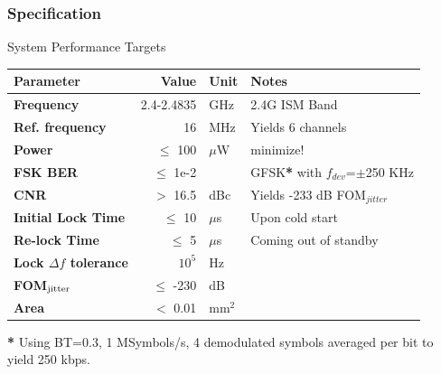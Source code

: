 \documentclass[t, screen, aspectratio=43]{beamer}
\begin{document}
\begin{frame}
	\frametitle{Specification\color{black}}
	\begin{block}{System Performance Targets}
		\tiny
		\begin{table}[h!]
			\centering
			\def\arraystretch{1.5}		
			\setlength\arrayrulewidth{0.75pt}
			\setlength{\tabcolsep}{1em} %
			\begin{tabular}{|l|r|l|l|}
				\hline 
				\rule[-1ex]{0pt}{2.5ex} \cellcolor{gray!40}\textbf{Parameter} & \cellcolor{gray!40}\textbf{Value} & \cellcolor{gray!40}\textbf{Unit }& \cellcolor{gray!40}\textbf{Notes}\\ 
				\hline 
				\rule[-1ex]{0pt}{2.5ex} \textbf{Frequency}  & 2.4-2.4835 & GHz & 2.4G ISM Band\\ 
				\hline 
				\rule[-1ex]{0pt}{2.5ex} \textbf{Ref. frequency} & 16 & MHz & Yields 6 channels \\ 
				\hline 
				\rule[-1ex]{0pt}{2.5ex} \textbf{Power} & $\leq$ 100  &$\mu$W & minimize!\\ 
				\hline 
				\rule[-1ex]{0pt}{2.5ex} \textbf{FSK BER} & $\leq$ 1e-2  & & GFSK\textbf{*} with $f_{dev}$=$\pm$250 KHz\\ 
				\hline 
				\rule[-1ex]{0pt}{2.5ex} \textbf{CNR} & $>$ 16.5 & dBc&Yields -233 dB FOM$_{jitter}$ \\ 
				\hline 
				\rule[-1ex]{0pt}{2.5ex} \textbf{Initial Lock Time} & $\leq$ 10 & $\mu$s & Upon cold start \\ 
				\hline 
				\rule[-1ex]{0pt}{2.5ex} \textbf{Re-lock Time} & $\leq$ 5 & $\mu$s & Coming out of standby \\ 
				\hline 
				\rule[-1ex]{0pt}{2.5ex} \textbf{Lock $\Delta f$ tolerance} & $10^5$ & Hz& \\ 
				\hline 
				\rule[-1ex]{0pt}{2.5ex} \textbf{FOM}$_{\textnormal{jitter}}$ & $\leq$ -230 & dB & \\ 
				\hline 
				\rule[-1ex]{0pt}{2.5ex} \textbf{Area} & $<$ 0.01  & mm$^2$ & \\ 
				\hline 
			\end{tabular} 
		\end{table}   
		\textbf{*} Using BT=0.3, 1 MSymbols/s, 4 demodulated symbols averaged per bit to yield 250 kbps.
	\end{block}    
\end{frame}
\end{document}
